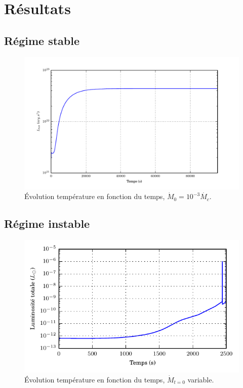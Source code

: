 \documentclass[french]{beamer}
\begin{document}
\section{Résultats}
\subsection*{Régime stable}

\begin{frame}
  \begin{figure}
\includegraphics[width=\columnwidth]{figures/Ltot_fonction_t_stable.pdf}
    \caption{Évolution température en fonction du temps, $\dot{M}_0 = 10^{-3}\dot{M_c}$.}
  \end{figure}
\end{frame}

\subsection*{Régime instable}

\begin{frame}
  \begin{figure}
    \includegraphics[width=.9\columnwidth]{figures/Ltot_fonction_t.pdf}
    \caption{Évolution température en fonction du temps, $\dot{M}_{t=0}$ variable.}
  \end{figure}  
\end{frame}
\end{document}

